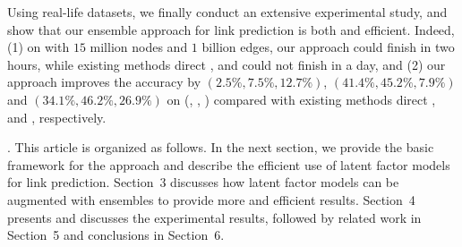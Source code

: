Using real-life datasets, we finally conduct an extensive experimental study,
and show that our ensemble approach for link prediction is both  and efficient.
Indeed, (1) on \Friendster with $15$ million nodes and $1$ billion edges, our approach could finish in
two hours, while existing methods direct \NMF, \Aa \cite{adamic} and \BIGCLAM \cite{yang-wsdm2013} could not finish in a day, and
(2) our approach improves the accuracy by $(2.5\%, 7.5\%, 12.7\%)$, $(41.4\%, 45.2\%, 7.9\%)$ and $(34.1\%, 46.2\%, 26.9\%)$ on (\Digg, \YouTube, \Wikipedia)
compared with existing methods  direct \NMF, \Aa and \BIGCLAM, respectively.


. This article is organized as follows. In the next section, we  provide
the basic framework for the approach and describe the efficient use
of  latent factor models for link prediction. Section~3 discusses
how latent factor models can be augmented with ensembles to provide
more  and efficient results. Section~4 presents and discusses the
experimental results, followed by related work in Section~5 and conclusions in Section~6.

